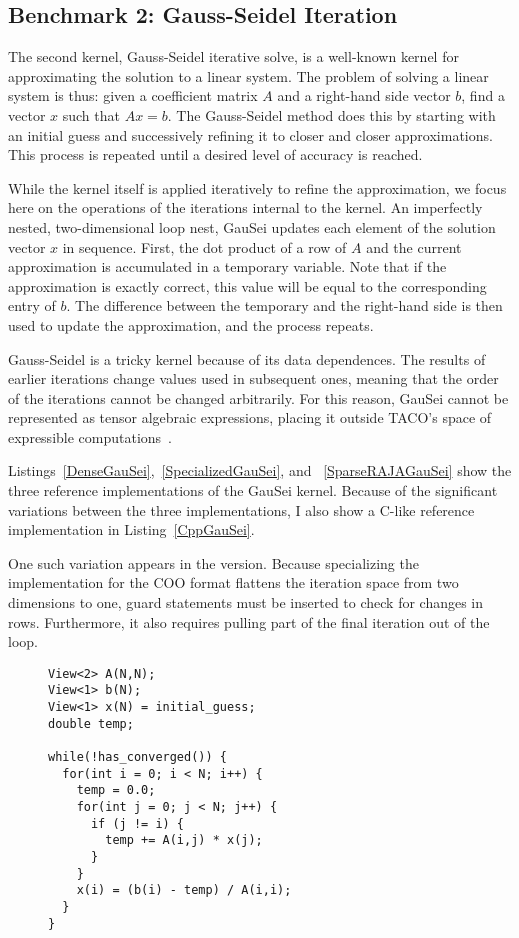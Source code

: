 \subsection{Benchmark 2: Gauss-Seidel Iteration}

The second kernel, Gauss-Seidel iterative solve, is a well-known kernel for approximating the solution to a linear system.
The problem of solving a linear system is thus: given a coefficient matrix $A$ and a right-hand side vector $b$, find a vector $x$ such that $Ax=b$.
The Gauss-Seidel method does this by starting with an initial guess and successively refining it to closer and closer approximations.
This process is repeated until a desired level of accuracy is reached.

While the kernel itself is applied iteratively to refine the approximation, we focus here on the operations of the iterations internal to the kernel.
An imperfectly nested, two-dimensional loop nest, GauSei updates each element of the solution vector $x$ in sequence.
First, the dot product of a row of $A$ and the current approximation is accumulated in a temporary variable.
Note that if the approximation is exactly correct, this value will be equal to the corresponding entry of $b$. 
The difference between the temporary and the right-hand side is then used to update the approximation, and the process repeats.

Gauss-Seidel is a tricky kernel because of its data dependences.
The results of earlier iterations change values used in subsequent ones, meaning that the order of the iterations cannot be changed arbitrarily. 
For this reason, GauSei cannot be represented as tensor algebraic expressions, placing it outside TACO's space of expressible computations~\cite{}.

Listings~\ref{DenseGauSei},~\ref{SpecializedGauSei}, and ~\ref{SparseRAJAGauSei} show the three reference implementations of the GauSei kernel.
Because of the significant variations between the three implementations, I also show a C-like reference implementation in Listing~\ref{CppGauSei}.

One such variation appears in the \specialized{} version. 
Because specializing the implementation for the COO format flattens the iteration space from two dimensions to one, guard statements must be inserted to check for changes in rows. 
Furthermore, it also requires pulling part of the final iteration out of the loop.

\begin{figure}
\begin{lstlisting}[caption={C-like version of Gauss-Seidel iteration},label=CppGauSei]
View<2> A(N,N);
View<1> b(N);
View<1> x(N) = initial_guess;
double temp;

while(!has_converged()) {
  for(int i = 0; i < N; i++) {
    temp = 0.0;
    for(int j = 0; j < N; j++) {
      if (j != i) {
        temp += A(i,j) * x(j);
      }
    }
    x(i) = (b(i) - temp) / A(i,i);
  }
}
\end{lstlisting}
\end{figure}

